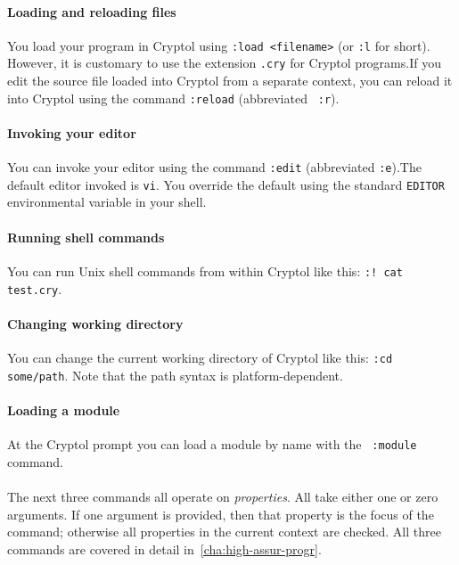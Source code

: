 \paragraph*{Loading and reloading files}
You load your program in Cryptol using {\tt :load <filename>} (or
\texttt{:l} for short).  However, it is customary to use the extension
{\tt .cry} for Cryptol programs.\indCmdLoad If you edit the source
file loaded into Cryptol from a separate context, you can reload it
into Cryptol using the command {\tt :reload} (abbreviated {\tt
  :r}).\indCmdReload

\paragraph*{Invoking your editor}
You can invoke your editor using the command {\tt :edit} (abbreviated
\texttt{:e}).\indCmdEdit The default editor invoked is
\texttt{vi}.  You override the default using the standard
\texttt{EDITOR} environmental variable in your shell.\indSettingEditor


\paragraph*{Running shell commands}
You can run Unix shell commands from within Cryptol like this:
\texttt{:!~cat test.cry}.\indCmdShell

\paragraph*{Changing working directory}
You can change the current working directory of Cryptol like this:
\texttt{:cd some/path}.  Note that the path syntax is
platform-dependent.

\paragraph*{Loading a module}
At the Cryptol prompt you can load a module by name with the {\tt
  :module} command.\indCmdLoadModule

\paragraph*{}
The next three commands all operate on \emph{properties}.  All take
either one or zero arguments.  If one argument is provided, then that
property is the focus of the command; otherwise all properties in the
current context are checked.  All three commands are covered in detail
in~\autoref{cha:high-assur-progr}.

